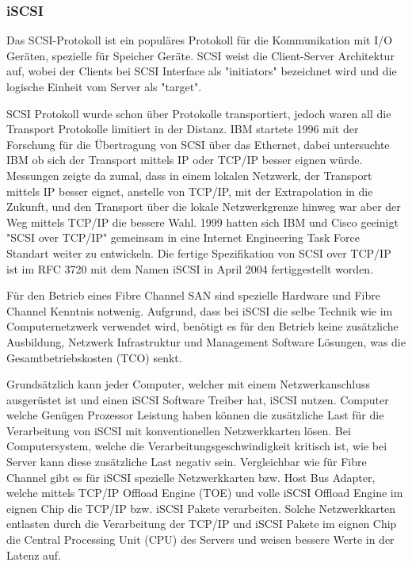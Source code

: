 \subsubsection{iSCSI}
Das SCSI-Protokoll ist ein populäres Protokoll für die Kommunikation mit I/O Geräten, spezielle für Speicher Geräte. SCSI weist die Client-Server Architektur auf, wobei der Clients bei SCSI Interface als "initiators" bezeichnet wird und die logische Einheit vom Server als "target".

SCSI Protokoll wurde schon über Protokolle transportiert, jedoch waren all die Transport Protokolle limitiert in der Distanz. IBM startete 1996 mit der Forschung für die Übertragung von SCSI über das Ethernet, dabei untersuchte IBM ob sich der Transport mittels IP oder TCP/IP besser eignen würde. Messungen zeigte da zumal, dass in einem lokalen Netzwerk, der Transport mittels IP besser eignet, anstelle von TCP/IP, mit der Extrapolation in die Zukunft, und den Transport über die lokale Netzwerkgrenze hinweg war aber der Weg mittels TCP/IP die bessere Wahl. 1999 hatten sich IBM und Cisco geeinigt "SCSI over TCP/IP" gemeinsam in eine Internet Engineering Task Force Standart weiter zu entwickeln. \cite{JohnL.202} Die fertige Spezifikation von SCSI over TCP/IP ist im RFC 3720 mit dem Namen iSCSI in April 2004 fertiggestellt worden.\cite{J.Satran2004}

Für den Betrieb eines Fibre Channel SAN sind spezielle Hardware und Fibre Channel Kenntnis notwenig. Aufgrund, dass bei iSCSI die selbe Technik wie im Computernetzwerk verwendet wird, benötigt es für den Betrieb keine zusätzliche Ausbildung, Netzwerk Infrastruktur und Management Software Lösungen, was die Gesamtbetriebskosten (TCO) senkt.

Grundsätzlich kann jeder Computer, welcher mit einem Netzwerkanschluss ausgerüstet ist und einen iSCSI Software Treiber hat, iSCSI nutzen. Computer welche Genügen Prozessor Leistung haben können die zusätzliche Last für die Verarbeitung von iSCSI mit konventionellen Netzwerkkarten lösen. Bei Computersystem, welche die Verarbeitungsgeschwindigkeit kritisch ist, wie bei Server kann diese zusätzliche Last negativ sein. Vergleichbar wie für Fibre Channel gibt es für iSCSI spezielle Netzwerkkarten bzw. Host Bus Adapter, welche mittels TCP/IP Offload Engine (TOE) und volle iSCSI Offload Engine im eignen Chip die TCP/IP bzw. iSCSI Pakete verarbeiten. Solche Netzwerkkarten entlasten durch die Verarbeitung der TCP/IP und iSCSI Pakete im eignen Chip die Central Processing Unit (CPU) des Servers und weisen bessere Werte in der Latenz auf.

